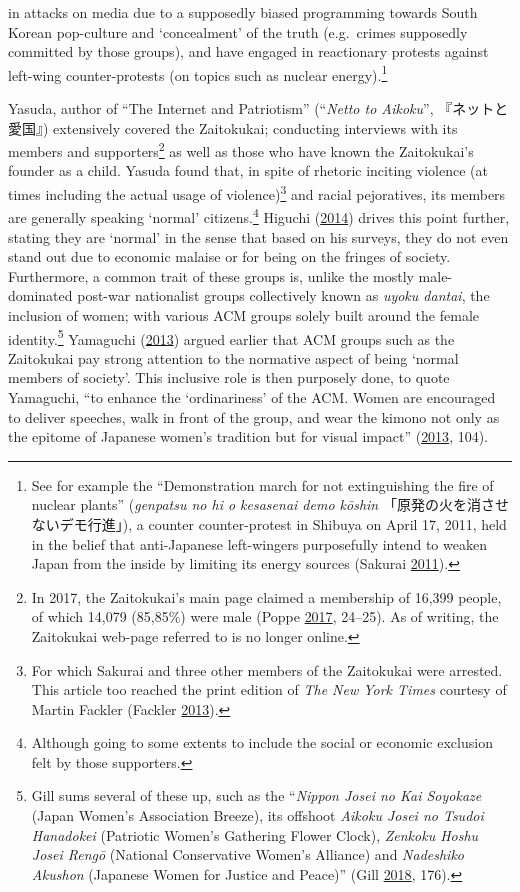 \documentclass[10pt,british,A4paper,oneside]{memoir}
\begin{document}
in attacks on media due to a supposedly biased programming towards South
Korean pop-culture and `concealment' of the truth (e.g.~crimes
supposedly committed by those groups), and have engaged in reactionary
protests against left-wing counter-protests (on topics such as nuclear
energy).\footnote{See for example the ``Demonstration march for not
  extinguishing the fire of nuclear plants'' (\emph{genpatsu no hi o
  kesasenai demo kōshin} 「原発の火を消させないデモ行進」), a counter
  counter-protest in Shibuya on April 17, 2011, held in the belief that
  anti-Japanese left-wingers purposefully intend to weaken Japan from
  the inside by limiting its energy sources (Sakurai
  \protect\hyperlink{ref-sakurai__2011}{2011}).}

Yasuda, author of ``The Internet and Patriotism'' (``\emph{Netto to
Aikoku}'', 『ネットと愛国』) extensively covered the Zaitokukai;
conducting interviews with its members and supporters\footnote{In 2017,
  the Zaitokukai's main page claimed a membership of 16,399 people, of
  which 14,079 (85,85\%) were male (Poppe
  \protect\hyperlink{ref-poppe_digitaal_2017}{2017}, 24--25). As of
  writing, the Zaitokukai web-page referred to is no longer online.} as
well as those who have known the Zaitokukai's founder as a child. Yasuda
found that, in spite of rhetoric inciting violence (at times including
the actual usage of violence)\footnote{For which Sakurai and three other
  members of the Zaitokukai were arrested. This article too reached the
  print edition of \emph{The New York Times} courtesy of Martin Fackler
  (Fackler \protect\hyperlink{ref-fackler_japanese_2013}{2013}).} and
racial pejoratives, its members are generally speaking `normal'
citizens.\footnote{Although going to some extents to include the social
  or economic exclusion felt by those supporters.} Higuchi
(\protect\hyperlink{ref-higuchi_japans_2014}{2014}) drives this point
further, stating they are `normal' in the sense that based on his
surveys, they do not even stand out due to economic malaise or for being
on the fringes of society. Furthermore, a common trait of these groups
is, unlike the mostly male-dominated post-war nationalist groups
collectively known as \emph{uyoku dantai}, the inclusion of women; with
various ACM groups solely built around the female identity.\footnote{Gill
  sums several of these up, such as the ``\emph{Nippon Josei no Kai
  Soyokaze} (Japan Women's Association Breeze), its offshoot
  \emph{Aikoku Josei no Tsudoi Hanadokei} (Patriotic Women's Gathering
  Flower Clock), \emph{Zenkoku Hoshu Josei Rengō} (National Conservative
  Women's Alliance) and \emph{Nadeshiko Akushon} (Japanese Women for
  Justice and Peace)'' (Gill
  \protect\hyperlink{ref-gill_nativist_2018}{2018}, 176).} Yamaguchi
(\protect\hyperlink{ref-yamaguchi_xenophobia_2013}{2013}) argued earlier
that ACM groups such as the Zaitokukai pay strong attention to the
normative aspect of being `normal members of society'. This inclusive
role is then purposely done, to quote Yamaguchi, ``to enhance the
`ordinariness' of the ACM. Women are encouraged to deliver speeches,
walk in front of the group, and wear the kimono not only as the epitome
of Japanese women's tradition but for visual impact''
(\protect\hyperlink{ref-yamaguchi_xenophobia_2013}{2013}, 104).
\end{document}
